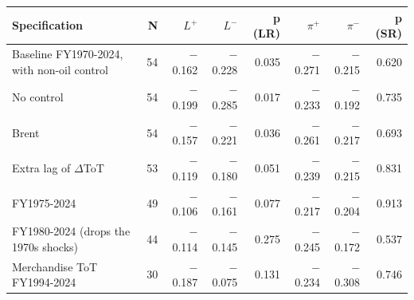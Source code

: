 \begin{tabular}{lrrrrrrr}
\toprule
Specification & N & $L^{+}$ & $L^{-}$ & p (LR) & $\pi^{+}$ & $\pi^{-}$ & p (SR) \\
\midrule
Baseline FY1970-2024, with non-oil control & 54 & $-$0.162 & $-$0.228 & 0.035 & $-$0.271 & $-$0.215 & 0.620 \\
No control & 54 & $-$0.199 & $-$0.285 & 0.017 & $-$0.233 & $-$0.192 & 0.735 \\
Brent & 54 & $-$0.157 & $-$0.221 & 0.036 & $-$0.261 & $-$0.217 & 0.693 \\
Extra lag of $\Delta$ToT & 53 & $-$0.119 & $-$0.180 & 0.051 & $-$0.239 & $-$0.215 & 0.831 \\
FY1975-2024 & 49 & $-$0.106 & $-$0.161 & 0.077 & $-$0.217 & $-$0.204 & 0.913 \\
FY1980-2024 (drops the 1970s shocks) & 44 & $-$0.114 & $-$0.145 & 0.275 & $-$0.245 & $-$0.172 & 0.537 \\
Merchandise ToT FY1994-2024 & 30 & $-$0.187 & $-$0.075 & 0.131 & $-$0.234 & $-$0.308 & 0.746 \\
\bottomrule
\end{tabular}
